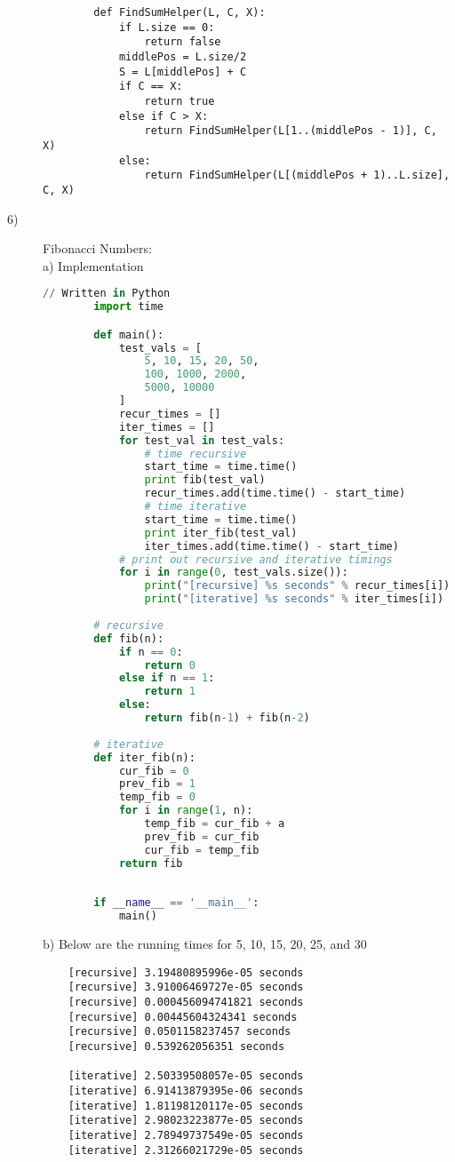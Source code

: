 \documentclass[paper=a4, fontsize=11pt]{scrartcl} %
\numberwithin{equation}{section} %
\numberwithin{figure}{section} %
\numberwithin{table}{section} %
\begin{document}
\begin{description}
\begin{lstlisting}
        def FindSumHelper(L, C, X):
            if L.size == 0:
                return false
            middlePos = L.size/2
            S = L[middlePos] + C
            if C == X:
                return true
            else if C > X:
                return FindSumHelper(L[1..(middlePos - 1)], C, X)
            else:
                return FindSumHelper(L[(middlePos + 1)..L.size], C, X)
        \end{lstlisting}
    \item[6)] Fibonacci Numbers: \hfill \\
        a) Implementation
        \begin{lstlisting}[language=Python]
        // Written in Python
        import time

        def main():
            test_vals = [
                5, 10, 15, 20, 50, 
                100, 1000, 2000, 
                5000, 10000
            ]
            recur_times = []
            iter_times = []
            for test_val in test_vals:
                # time recursive
                start_time = time.time()
                print fib(test_val)
                recur_times.add(time.time() - start_time)
                # time iterative
                start_time = time.time()
                print iter_fib(test_val)
                iter_times.add(time.time() - start_time)
            # print out recursive and iterative timings
            for i in range(0, test_vals.size()):
                print("[recursive] %s seconds" % recur_times[i])
                print("[iterative] %s seconds" % iter_times[i])
        
        # recursive
        def fib(n):
            if n == 0:
                return 0
            else if n == 1:
                return 1
            else:
                return fib(n-1) + fib(n-2)
        
        # iterative
        def iter_fib(n):
            cur_fib = 0
            prev_fib = 1
            temp_fib = 0
            for i in range(1, n):
                temp_fib = cur_fib + a
                prev_fib = cur_fib
                cur_fib = temp_fib
            return fib
        
        
        if __name__ == '__main__':
            main()
    \end{lstlisting}


    b) Below are the running times for 5, 10, 15, 20, 25, and 30
    \begin{lstlisting}
    [recursive] 3.19480895996e-05 seconds
    [recursive] 3.91006469727e-05 seconds
    [recursive] 0.000456094741821 seconds
    [recursive] 0.00445604324341 seconds
    [recursive] 0.0501158237457 seconds
    [recursive] 0.539262056351 seconds

    [iterative] 2.50339508057e-05 seconds
    [iterative] 6.91413879395e-06 seconds
    [iterative] 1.81198120117e-05 seconds
    [iterative] 2.98023223877e-05 seconds
    [iterative] 2.78949737549e-05 seconds
    [iterative] 2.31266021729e-05 seconds
    \end{lstlisting}
\end{description}

\end{document}
